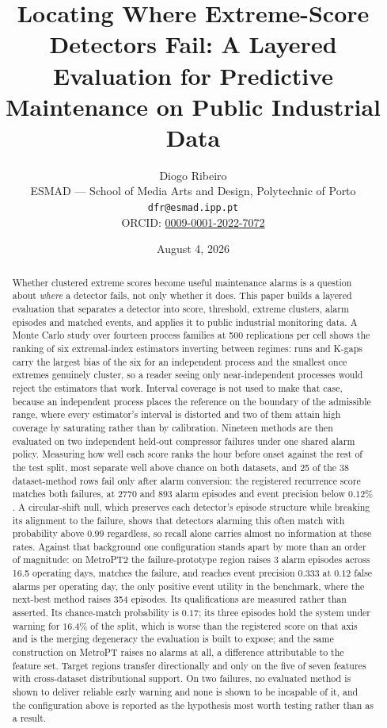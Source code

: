 \documentclass[11pt]{article}
\title{Locating Where Extreme-Score Detectors Fail: A Layered Evaluation for Predictive Maintenance on Public Industrial Data}
\author{%
  Diogo Ribeiro\\
  ESMAD --- School of Media Arts and Design, Polytechnic of Porto\\
  \texttt{dfr@esmad.ipp.pt}\\
  ORCID: \href{https://orcid.org/0009-0001-2022-7072}{0009-0001-2022-7072}%
}
\date{August 4, 2026}
\begin{document}
\maketitle

\begin{abstract}
Whether clustered extreme scores become useful maintenance alarms is a question about \emph{where} a detector fails, not only whether it does. This paper builds a layered evaluation that separates a detector into score, threshold, extreme clusters, alarm episodes and matched events, and applies it to public industrial monitoring data. A Monte Carlo study over fourteen process families at 500 replications per cell shows the ranking of six extremal-index estimators inverting between regimes: runs and K-gaps carry the largest bias of the six for an independent process and the smallest once extremes genuinely cluster, so a reader seeing only near-independent processes would reject the estimators that work. Interval coverage is not used to make that case, because an independent process places the reference on the boundary of the admissible range, where every estimator's interval is distorted and two of them attain high coverage by saturating rather than by calibration. Nineteen methods are then evaluated on two independent held-out compressor failures under one shared alarm policy. Measuring how well each score ranks the hour before onset against the rest of the test split, most separate well above chance on both datasets, and 25 of the 38 dataset-method rows fail only after alarm conversion: the registered recurrence score matches both failures, at 2770 and 893 alarm episodes and event precision below \(0.12\%\). A circular-shift null, which preserves each detector's episode structure while breaking its alignment to the failure, shows that detectors alarming this often match with probability above \(0.99\) regardless, so recall alone carries almost no information at these rates. Against that background one configuration stands apart by more than an order of magnitude: on MetroPT2 the failure-prototype region raises 3 alarm episodes across 16.5 operating days, matches the failure, and reaches event precision \(0.333\) at \(0.12\) false alarms per operating day, the only positive event utility in the benchmark, where the next-best method raises 354 episodes. Its qualifications are measured rather than asserted. Its chance-match probability is \(0.17\); its three episodes hold the system under warning for \(16.4\%\) of the split, which is worse than the registered score on that axis and is the merging degeneracy the evaluation is built to expose; and the same construction on MetroPT raises no alarms at all, a difference attributable to the feature set. Target regions transfer directionally and only on the five of seven features with cross-dataset distributional support. On two failures, no evaluated method is shown to deliver reliable early warning and none is shown to be incapable of it, and the configuration above is reported as the hypothesis most worth testing rather than as a result.
\end{abstract}
\end{document}
